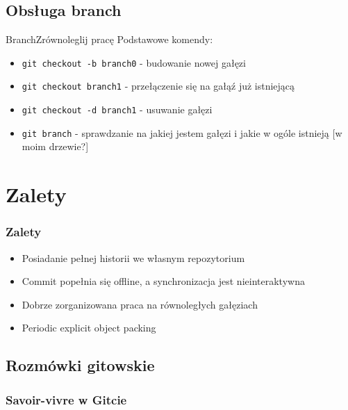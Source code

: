 \documentclass{beamer}
\begin{document}
\subsection{Obsługa branch}
\begin{frame}{Branch}{Zrównoleglij pracę}
 Podstawowe komendy:
 \begin{itemize}
  \item \texttt{git checkout -b branch0} - budowanie nowej gałęzi
  \item \texttt{git checkout  branch1} - przełączenie się na gałąź już istniejącą
  \item \texttt{git checkout -d branch1} - usuwanie gałęzi
  \item \texttt{git branch} - sprawdzanie na jakiej jestem gałęzi i jakie w ogóle istnieją [w moim drzewie?]
 \end{itemize}

\end{frame}

\section{Zalety}

\begin{frame}
\frametitle{Zalety}
\begin{itemize}
 \item Posiadanie pełnej historii we własnym repozytorium
 \item Commit popełnia się offline, a synchronizacja jest nieinteraktywna
 \item Dobrze zorganizowana praca na równoległych gałęziach
 \item Periodic explicit object packing
\end{itemize}
 
\end{frame}

\subsection{Rozmówki gitowskie}
\begin{frame}
 \frametitle{Savoir-vivre w Gitcie}
\end{frame}
\end{document}
